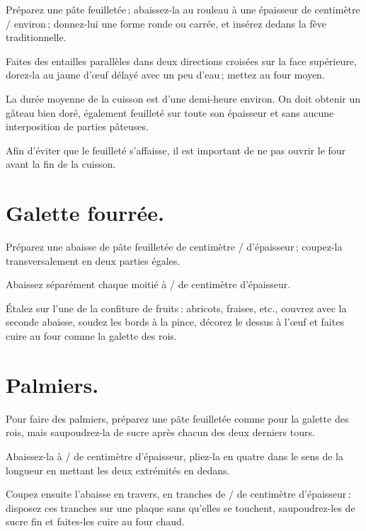 Préparez une pâte feuilletée ; abaissez-la au rouleau à une épaisseur de
{\mmm} centimètre {\mmm}/{\mmm} environ ; donnez-lui une forme
ronde ou carrée, et insérez dedans la fève traditionnelle.

Faites des entailles parallèles dans deux directions croisées sur la face
supérieure, dorez-la au jaune d'œuf délayé avec un peu d'eau ; mettez au four
moyen.

La durée moyenne de la cuisson est d’une demi-heure environ. On doit obtenir un
gâteau bien doré, également feuilleté sur toute son épaisseur et sans aucune
interposition de parties pâteuses.

Afin d'éviter que le feuilleté s'affaisse, il est important de ne pas ouvrir le
four avant la fin de la cuisson.

\section*{\centering Galette fourrée.}
{}

Préparez une abaisse de pâte feuilletée de {\mmm} centimètre
{\mmm}/{\mmm} d'épaisseur ; coupez-la transversalement en deux
parties égales.

Abaissez séparément chaque moitié à {\mmm}/{\mmm} de centimètre
d'épaisseur.

Étalez sur l'une de la confiture de fruits : abricots, fraises, etc., couvrez
avec la seconde abaisse, soudez les bords à la pince, décorez le dessus à l'œuf
et faites cuire au four comme la galette des rois.

\section*{\centering Palmiers.}
{}

Pour faire des palmiers, préparez une pâte feuilletée comme pour la galette des
rois, mais saupoudrez-la de sucre après chacun des deux derniers tours.

Abaissez-la à {\mmm}/{\mmm} de centimètre d'épaisseur, pliez-la en
quatre dans le sens de la longueur en mettant les deux extrémités en dedans.

Coupez ensuite l'abaisse en travers, en tranches de {\mmm}/{\mmm} de
centimètre d'épaisseur : disposez ces tranches sur une plaque sans qu'elles se
touchent, saupoudrez-les de sucre fin et faites-les cuire au four chaud.

